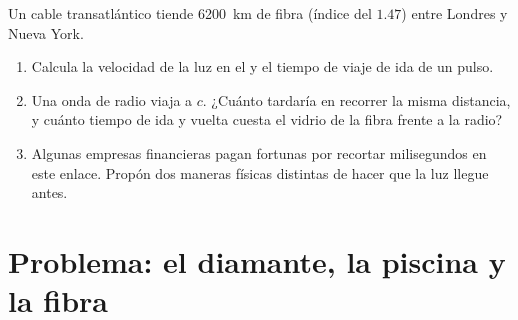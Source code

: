 \begin{exercise}[$\star\star\star$]\label{exo:g10:refraction:15}
Un cable transatlántico tiende \qty{6200}{km} de fibra (índice del
 $1.47$) entre Londres y Nueva York.
\begin{enumerate}
  \item Calcula la velocidad de la luz en el  y el tiempo de viaje
        de ida de un pulso.
  \item Una onda de radio viaja a $c$. ¿Cuánto tardaría en recorrer la
        misma distancia, y cuánto tiempo de ida y vuelta cuesta el
        vidrio de la fibra frente a la radio?
  \item Algunas empresas financieras pagan fortunas por recortar
        milisegundos en este enlace. Propón dos maneras físicas
        distintas de hacer que la luz llegue antes.
\end{enumerate}
\end{exercise}

\section{Problema: el diamante, la piscina y la fibra}

